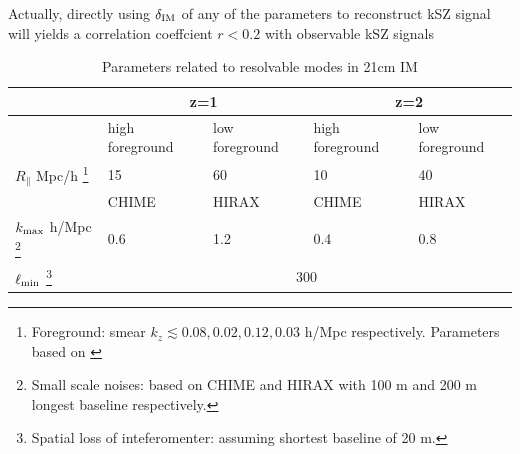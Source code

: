 Actually, directly using $\delta_\mathrm{IM}$ of any of the parameters 
to reconstruct kSZ signal will 
yields a correlation coeffcient $r<0.2$ 
with observable kSZ signals 

\begin{table}
\begin{tabular}{|m{2cm}|m{1.5cm}|m{1.5cm}|m{1.5cm}|m{1.5cm}|}
    \hline
     & \multicolumn{2}{|c|}{z=1} &\multicolumn{2}{|c|}{z=2}\\
     \hline
     & high foreground &low foreground&high foreground& low foreground\\
     \cline{2-5}
     $R_\parallel$ Mpc/h
     \footnote{Foreground: smear $k_z\lesssim 0.08,0.02,0.12,0.03$ h/Mpc respectively. Parameters based on \cite{2013ApJ...763L..20M,Switzer13,15Shaw}}
      & 15 & 60 & 10 & 40 \\
     \hline
     & CHIME & HIRAX & CHIME &HIRAX\\
     \cline{2-5}
     $k_\mathrm{max}$ h/Mpc 
     \footnote{Small scale noises: based on CHIME\cite{2014CHIME} and HIRAX\cite{HIRAX} 
     with 100 m and 200 m longest baseline respectively.}
     & 0.6 & 1.2 & 0.4 & 0.8 \\
     \hline
     $\ell_\mathrm{min}$
     \footnote{Spatial loss of inteferomenter: assuming shortest baseline of 20 m.}
     & \multicolumn{4}{|c|}{300} \\
     \hline
\end{tabular}
     \caption{Parameters related to resolvable modes in 21cm IM}
     \label{tab:para}
\end{table}
